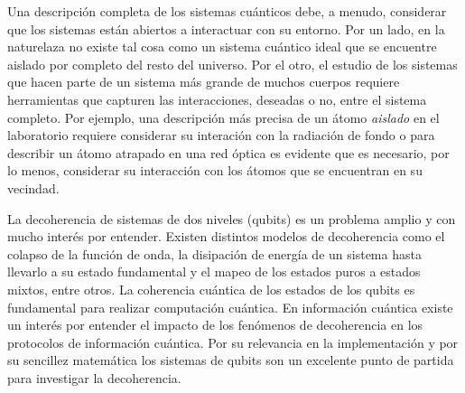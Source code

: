 %
%



Una descripción completa de los sistemas cuánticos debe, a menudo, considerar
que los sistemas están abiertos a interactuar con su entorno. Por un lado, 
en la naturelaza no existe tal cosa como un sistema cuántico ideal que 
se encuentre aislado por completo del resto del universo. Por el otro, 
el estudio de los sistemas que hacen parte de un sistema más grande 
de muchos cuerpos requiere herramientas que capturen las interacciones, 
deseadas o no, entre el sistema completo. Por ejemplo, una descripción más
precisa de un átomo \textit{aislado} en el laboratorio requiere considerar 
su interación con la radiación de fondo o para describir un átomo atrapado 
en una red óptica es evidente que es necesario, por lo menos, considerar 
su interacción con los átomos que se encuentran en su vecindad.


La decoherencia de sistemas de dos niveles (qubits) es un problema amplio 
y con mucho interés por entender. 
Existen distintos modelos de decoherencia como el colapso de la función 
de onda, la disipación de energía de un sistema hasta llevarlo a su estado 
fundamental y el mapeo de los estados puros a estados mixtos, entre otros.
%   
La coherencia cuántica de los estados de los qubits es fundamental 
para realizar computación cuántica. En información cuántica existe un interés por 
entender el impacto de los fenómenos de decoherencia 
en los protocolos de información cuántica.  
Por su relevancia en la implementación y por su sencillez matemática 
los sistemas de qubits son un excelente punto de partida para investigar la
decoherencia.

